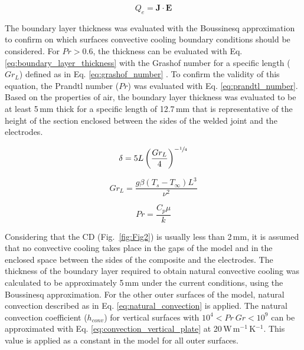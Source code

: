 \documentclass[review,times,sagev,doublespace]{sagej}
\begin{document}
\begin{equation}
Q_e =  \mathbf{J} \cdot \mathbf{E} 
\label{electromagnetic_heat_source_term}
\end{equation}

The boundary layer thickness was evaluated with the Boussinesq approximation to confirm on which surfaces convective cooling boundary conditions should be considered. 
For $Pr > 0.6 $, the thickness can be evaluated with Eq. \ref{eq:boundary_layer_thickness} with the Grashof number for a specific length ($Gr_L$) defined as in Eq. \ref{eq:grashof_number} \cite{Incropera2007}. 
To confirm the validity of this equation, the Prandtl number ($Pr$) was evaluated with Eq. \ref{eq:prandtl_number}. 
Based on the properties of air, the boundary layer thickness was evaluated to be at least \mbox{5\,mm} thick for a specific length of \mbox{12.7\,mm} that is representative of the height of the section enclosed between the sides of the welded joint and the electrodes. 

\begin{equation}
\delta = 5 L \left( \frac{Gr_L}{4} \right)^{-\sfrac{1}{4} }
\label{eq:boundary_layer_thickness}
\end{equation}

\begin{equation}
Gr_L = \frac{g \beta \left( T_s - T_{\infty} \right) L^3}{\nu^2}
\label{eq:grashof_number}
\end{equation}

\begin{equation}
Pr = \frac{C_p \mu}{k}
\label{eq:prandtl_number}
\end{equation}

Considering that the CD (Fig.~\ref{fig:Fig2}) is usually less than \mbox{2\,mm}, it is assumed that no convective cooling takes place in the gaps of the model and in the enclosed space between the sides of the composite and the electrodes. 
{
The thickness of the boundary layer required to obtain natural convective cooling was calculated to be approximately \mbox{5\,mm} under the current conditions, using the Boussinesq approximation. 
}
For the other outer surfaces of the model, natural convection described as in Eq. \ref{eq:natural_convection} is applied. 
The natural convection coefficient ($h_{conv}$) for vertical surfaces with $10^4 < Pr \ Gr < 10^9$ can be approximated with Eq. \ref{eq:convection_vertical_plate} at \mbox{20\,W\,m$^{-1}$\,K$^{-1}$}.
This value is applied as a constant in the model for all outer surfaces. 
\end{document}
